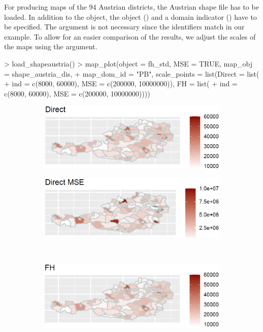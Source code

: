 For producing maps of the 94 Austrian districts, the Austrian shape file has to be loaded. In addition to the  object, the  object () and a domain indicator () have to be specified. The  argument is not necessary since the identifiers match in our example. To allow for an easier comparison of the results, we adjust the scales of the maps using the  argument.
\begin{example}
> load_shapeaustria()
> map_plot(object = fh_std, MSE = TRUE, map_obj = shape_austria_dis,
+   map_dom_id = "PB", scale_points = list(Direct = list(
+   ind = c(8000, 60000), MSE = c(200000, 10000000)), FH = list(
+   ind = c(8000, 60000), MSE = c(200000, 10000000))))
\end{example}
\begin{figure}[H]
	\begin{subfigure}[t]{0.49\textwidth}
		\includegraphics[width=\textwidth]{figures/map1.png}
		\caption{}
		\label{fig:mapa}
	\end{subfigure}\hfill%
	\begin{subfigure}[t]{0.49\textwidth}
		\includegraphics[width=\textwidth]{figures/map2.png}
		\caption{}
		\label{fig:mapb}
	\end{subfigure}\\[5pt]%
	\begin{subfigure}[t]{0.49\textwidth}
		\includegraphics[width=\textwidth]{figures/map3.png}

\end{subfigure}
\end{figure}
